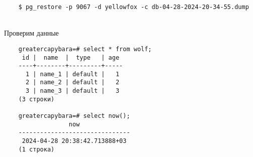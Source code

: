 \documentclass{article}
\begin{document}
\begin{verbatim}
    $ pg_restore -p 9067 -d yellowfox -c db-04-28-2024-20-34-55.dump
\end{verbatim} \\
Проверим данные

\begin{verbatim}
    greatercapybara=# select * from wolf;
     id |  name  |  type   | age
    ----+--------+---------+-----
      1 | name_1 | default |   1
      2 | name_2 | default |   2
      3 | name_3 | default |   3
    (3 строки)
    
    greatercapybara=# select now();
                  now
    -------------------------------
     2024-04-28 20:38:42.713888+03
    (1 строка)
\end{verbatim}
\end{document}
